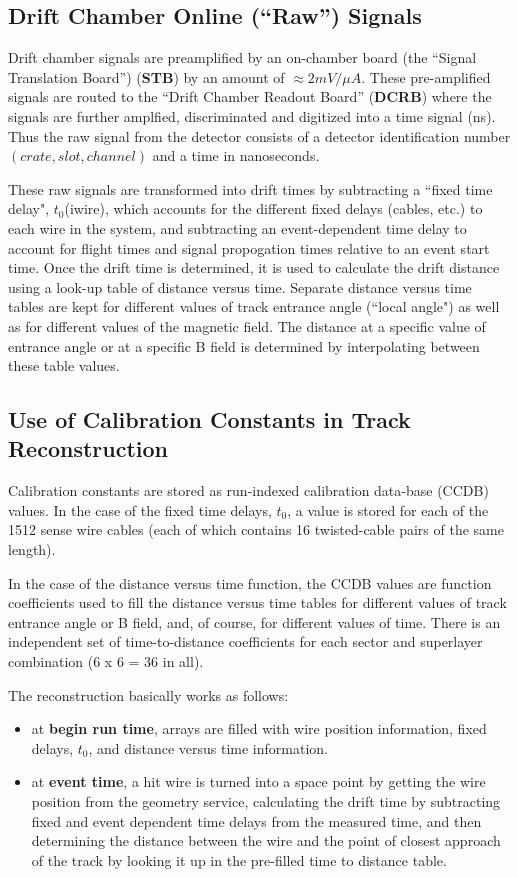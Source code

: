 \documentclass{article}
\begin{document}
\subsection{Drift Chamber Online (``Raw'') Signals}
\label{sec:rawsignals}

Drift chamber signals are preamplified by an on-chamber board (the ``Signal
Translation Board'') ({\bf STB}) by an amount of $\approx 2 mV/\mu A$.
These pre-amplified signals are routed to the ``Drift Chamber Readout Board'' 
({\bf DCRB}) where the signals are further amplfied, discriminated and digitized into
a time signal (ns).  Thus the raw signal from the detector consists of
a detector identification number $(crate,slot,channel)$ and a time in nanoseconds.

These raw signals are transformed into drift times by subtracting a ``fixed time delay", 
$t_0$(iwire), which accounts for the different fixed delays (cables, etc.)
to each wire in the system, and subtracting an event-dependent time
delay to account for flight times and signal propogation times relative
to an event start time.  Once the drift time is determined, it is used
to calculate the drift distance using a look-up table of distance
versus time.  Separate distance versus time tables are kept for different
values of track entrance angle (``local angle") as well as for different
values of the magnetic field.  The distance at a specific value of entrance
angle or at a specific B field is determined by interpolating between
these table values.

\subsection{Use of Calibration Constants in Track Reconstruction}
\label{sec:trkrecon}

Calibration constants are stored as run-indexed calibration data-base (CCDB)
values.  In the case of
the fixed time delays, $t_0$, a value is stored for each of the 
1512 sense wire cables (each of which contains 16 twisted-cable pairs of the
same length).  

In the case of the distance versus time function, the
CCDB values are function coefficients used to fill the distance versus
time tables for different values of track entrance angle or B field, and,
of course, for different values of time.   
There is an independent set of time-to-distance coefficients for each
sector and superlayer combination (6 x 6 = 36 in all).

The reconstruction basically works as follows:
\begin{itemize}
\item at {\bf begin run time}, arrays are filled with wire position 
information, fixed delays, $t_0$, and distance versus time information.
\item at {\bf event time}, a hit wire is turned into
a space point by getting the wire position from the geometry service, 
calculating the drift time by subtracting fixed and event dependent time
delays from the measured time, and then determining the 
distance between the wire and
the point of closest approach of the track by looking it up in the pre-filled 
time to distance table.
\end{itemize}
\end{document}
